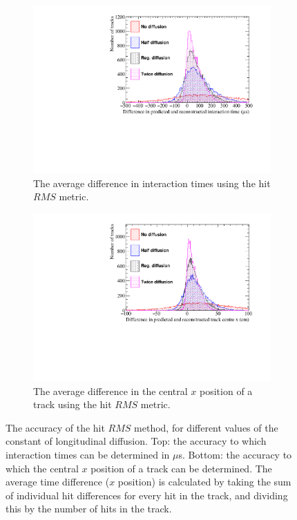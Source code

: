
\begin{figure}
  \centering
  \begin{subfigure}{0.6\textwidth}
    \centering
    \includegraphics[width=\textwidth]{Canvas_AvDiff_T_RMS_Diffusion}
    \caption{The average difference in interaction times using the hit $RMS$ metric.}
    \label{fig:DiffLDiff_AvDiffRMS_T}
  \end{subfigure}
  \begin{subfigure}{0.6\textwidth}
    \centering
    \includegraphics[width=\textwidth]{Canvas_AvDiff_X_RMS_Diffusion}
    \caption{The average difference in the central $x$ position of a track using the hit $RMS$ metric.}
    \label{fig:DiffLDiff_AvDiffRMS_X}
  \end{subfigure}
  \caption[Comparing the accuracy of the hit $RMS$ method, as the constant of longitudinal diffusion changes]
          {The accuracy of the hit $RMS$ method, for different values of the constant of longitudinal diffusion. Top: the accuracy to which interaction times can be determined in $\mu$s. Bottom: the accuracy to which the central $x$ position of a track can be determined. The average time difference ($x$ position) is calculated by taking the sum of individual hit differences for every hit in the track, and dividing this by the number of hits in the track.}
  \label{fig:DiffLDiff_AvDiff_RMS}
\end{figure}

